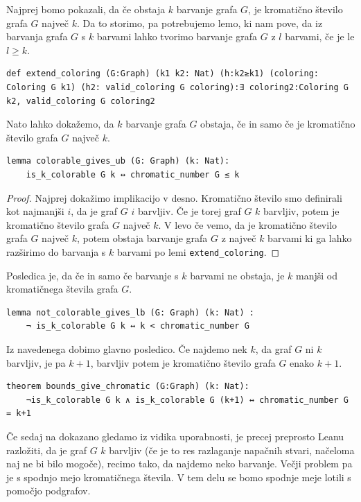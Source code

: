 \documentclass[mat1]{fmfdelo}
\begin{document}
Najprej bomo pokazali, da če obstaja $k$ barvanje grafa $G$, je kromatično število grafa $G$ največ $k$. Da to storimo, pa potrebujemo
lemo, ki nam pove, da iz barvanja grafa $G$ s $k$ barvami lahko tvorimo barvanje grafa $G$ z $l$ barvami, če je le $l\geq k$.
\begin{lstlisting}
def extend_coloring (G:Graph) (k1 k2: Nat) (h:k2≥k1) (coloring: Coloring G k1) (h2: valid_coloring G coloring):∃ coloring2:Coloring G k2, valid_coloring G coloring2
\end{lstlisting}
Nato lahko dokažemo, da $k$ barvanje grafa $G$ obstaja, če in samo če je kromatično število grafa $G$ največ $k$.
\begin{lstlisting}
lemma colorable_gives_ub (G: Graph) (k: Nat):
    is_k_colorable G k ↔ chromatic_number G ≤ k
\end{lstlisting}
\begin{proof}
Najprej dokažimo implikacijo v desno. Kromatično število smo definirali kot najmanjši $i$, da je graf $G$ $i$ barvljiv.
Če je torej graf $G$ $k$ barvljiv, potem je kromatično število grafa $G$ največ $k$.
V levo če vemo, da je kromatično število grafa $G$ največ $k$, potem obstaja barvanje grafa $G$ z največ $k$ barvami
ki ga lahko razširimo do barvanja s $k$ barvami po lemi \lstinline{extend_coloring}.
\end{proof}

Posledica je, da če in samo če barvanje s $k$ barvami ne obstaja, je $k$ manjši od kromatičnega števila grafa $G$.
\begin{lstlisting}
lemma not_colorable_gives_lb (G: Graph) (k: Nat) :
    ¬ is_k_colorable G k ↔ k < chromatic_number G
\end{lstlisting}

Iz navedenega dobimo glavno posledico.
Če najdemo nek $k$, da graf $G$ ni $k$ barvljiv, je pa $k+1$, barvljiv potem je kromatično število grafa $G$ enako $k+1$.
\begin{lstlisting}
theorem bounds_give_chromatic (G:Graph) (k: Nat):
    ¬is_k_colorable G k ∧ is_k_colorable G (k+1) ↔ chromatic_number G = k+1
\end{lstlisting}

Če sedaj na dokazano gledamo iz vidika uporabnosti, je precej preprosto Leanu razložiti, da je graf $G$ $k$ barvljiv
(če je to res razlaganje napačnih stvari, načeloma naj ne bi bilo mogoče), recimo tako, da najdemo neko barvanje. Večji problem pa je
s spodnjo mejo kromatičnega števila. 
V tem delu se bomo spodnje meje lotili s pomočjo podgrafov.
\end{document}
